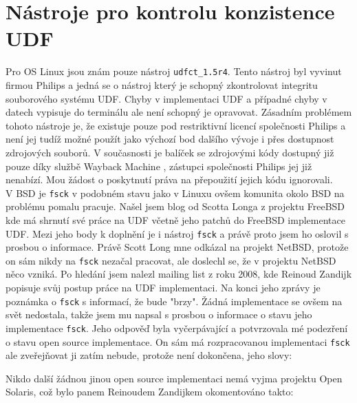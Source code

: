 \chapter{Nástroje pro kontrolu konzistence UDF}
\label{sec:nastroje}
Pro OS Linux jsou znám pouze nástroj \texttt{udfct\_1.5r4}. Tento nástroj byl vyvinut firmou Philips a jedná se o nástroj který je schopný zkontrolovat integritu souborového systému UDF. Chyby v implementaci UDF a případné chyby v datech vypisuje do terminálu ale není schopný je opravovat. Zásadním problémem tohoto nástroje je, že existuje pouze pod restriktivní licencí společnosti Philips a není jej tudíž možné použít jako výchozí bod dalšího vývoje i přes dostupnost zdrojových souborů. V současnosti je balíček se zdrojovými kódy dostupný již pouze díky službě Wayback Machine \cite{wayback}, zástupci společnosti Philips jej již nenabízí. Mou žádost o poskytnutí práva na přepoužití jejich kódu ignorovali.\\
V BSD je \texttt{fsck} v podobném stavu jako v Linuxu ovšem komunita okolo BSD na problému pomalu pracuje. Našel jsem blog \cite{scottuvblog} od Scotta Longa z projektu FreeBSD kde má shrnutí své práce na UDF včetně jeho patchů do FreeBSD implementace UDF. Mezi jeho body k doplnění je i nástroj \texttt{fsck} a právě proto jsem ho oslovil s prosbou o informace. Právě Scott Long mne odkázal na projekt NetBSD, protože on sám nikdy na \texttt{fsck} nezačal pracovat, ale doslechl se, že v projektu NetBSD něco vzniká. Po hledání jsem nalezl mailing list z roku 2008, kde Reinoud Zandijk popisuje svůj postup práce na UDF implementaci. Na konci jeho zprávy je poznámka o \texttt{fsck} s informací, že bude "brzy". Žádná implementace se ovšem na svět nedostala, takže jsem mu napsal s prosbou o informace o  stavu jeho implementace \texttt{fsck}. Jeho odpověď byla vyčerpávající a potvrzovala mé podezření o stavu open source implementace. On sám má rozpracovanou implementaci \texttt{fsck} ale zveřejňovat ji zatím nebude, protože není dokončena, jeho slovy: 
\begin{quote} 
\end{quote} 
Nikdo další žádnou jinou open source implementaci nemá vyjma projektu Open Solaris, což bylo panem Reinoudem Zandijkem okomentováno takto:
\begin{quote}
\end{quote}
